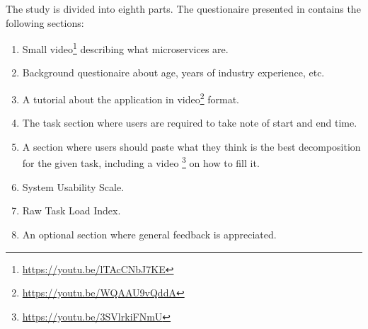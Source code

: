 The study is divided into eighth parts. The questionaire presented in
 contains the following sections:

\begin{enumerate}[1.]
  \item Small video\footnote{\url{https://youtu.be/lTAcCNbJ7KE}} describing
    what microservices are.
  \item Background questionaire about age, years of industry experience, etc.
  \item A tutorial about the application in
    video\footnote{\url{https://youtu.be/WQAAU9vQddA}} format.
  \item The task section where users are required to take note of start and end
    time. 
  \item A section where users should paste what they think is the best
    decomposition for the given task, including a video
    \footnote{\url{https://youtu.be/3SVlrkiFNmU}} on how to fill it.
  \item System Usability Scale. 
  \item Raw Task Load Index. 
  \item An optional section where general feedback is appreciated.
\end{enumerate}
